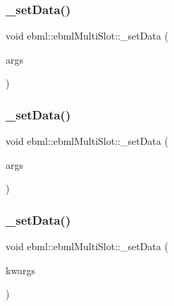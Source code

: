 \subsubsection{\texorpdfstring{\+\_\+set\+Data()}{\_setData()}\hspace{0.1cm}{\footnotesize\ttfamily [1/4]}}
{\footnotesize\ttfamily void ebml\+::ebml\+Multi\+Slot\+::\+\_\+set\+Data (\begin{DoxyParamCaption}\item[{const \mbox{\hyperlink{namespaceebml_ae432575dfbb3e141ce897442794f0ca5}{slot\+Arg\+\_\+l}} \&}]{args }\end{DoxyParamCaption})\hspace{0.3cm}{\ttfamily [protected]}}

\mbox{\label{classebml_1_1ebmlMultiSlot_a5113a76cfd5de57c83b6ecb2f459d848}} 
\subsubsection{\texorpdfstring{\+\_\+set\+Data()}{\_setData()}\hspace{0.1cm}{\footnotesize\ttfamily [2/4]}}
{\footnotesize\ttfamily void ebml\+::ebml\+Multi\+Slot\+::\+\_\+set\+Data (\begin{DoxyParamCaption}\item[{\mbox{\hyperlink{namespaceebml_ae432575dfbb3e141ce897442794f0ca5}{slot\+Arg\+\_\+l}} \&\&}]{args }\end{DoxyParamCaption})\hspace{0.3cm}{\ttfamily [protected]}}

\mbox{\label{classebml_1_1ebmlMultiSlot_ada5486b817bc70eaaebec2cd80c8ecf1}} 
\subsubsection{\texorpdfstring{\+\_\+set\+Data()}{\_setData()}\hspace{0.1cm}{\footnotesize\ttfamily [3/4]}}
{\footnotesize\ttfamily void ebml\+::ebml\+Multi\+Slot\+::\+\_\+set\+Data (\begin{DoxyParamCaption}\item[{const \mbox{\hyperlink{namespaceebml_a4317d4c495715eced3ed448c2d05caeb}{slot\+Arg\+\_\+d}} \&}]{kwargs }\end{DoxyParamCaption})\hspace{0.3cm}{\ttfamily [protected]}}

